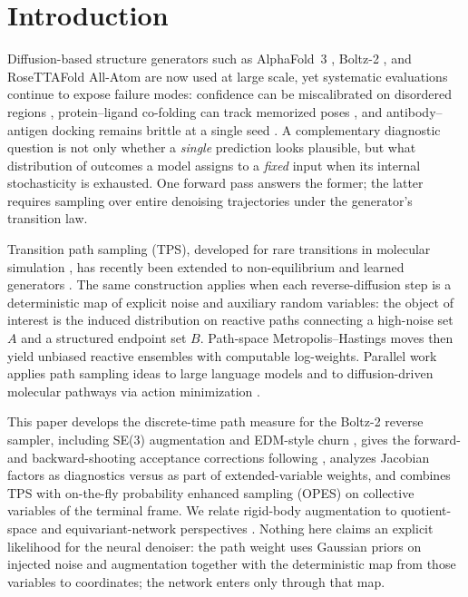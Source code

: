 \section{Introduction}
\label{sec:intro}

Diffusion-based structure generators such as AlphaFold~3 \citep{alphafold3},
Boltz-2 \citep{boltz2}, and RoseTTAFold All-Atom \citep{rfaa} are now used at
large scale, yet systematic evaluations continue to expose failure modes:
confidence can be miscalibrated on disordered regions \citep{gopalan2025},
protein--ligand co-folding can track memorized poses \citep{skrinjar2025}, and
antibody--antigen docking remains brittle at a single seed
\citep{hitawala2025}. A complementary diagnostic question is not only whether
a \emph{single} prediction looks plausible, but what distribution of outcomes a
model assigns to a \emph{fixed} input when its internal stochasticity is
exhausted. One forward pass answers the former; the latter requires sampling over
entire denoising trajectories under the generator's transition law.

Transition path sampling (TPS), developed for rare transitions in molecular
simulation \citep{dellago1998,bolhuis2002}, has recently been extended to
non-equilibrium and learned generators
\citep{buijsman2020,falkner2023,falkner2024}. The same construction applies when
each reverse-diffusion step is a deterministic map of explicit noise and
auxiliary random variables: the object of interest is the induced distribution
on reactive paths connecting a high-noise set $A$ and a structured endpoint
set $B$. Path-space Metropolis--Hastings moves then yield unbiased reactive
ensembles with computable log-weights. Parallel work applies path sampling ideas
to large language models \citep{dorman2026} and to diffusion-driven molecular
pathways via action minimization \citep{raja2025omtps}.

This paper develops the discrete-time path measure for the Boltz-2 reverse
sampler, including SE(3) augmentation and EDM-style churn \citep{karras2022},
gives the forward- and backward-shooting acceptance corrections following
\citet{buijsman2020,falkner2024}, analyzes Jacobian factors as diagnostics versus
as part of extended-variable weights, and combines TPS with on-the-fly
probability enhanced sampling (OPES) \citep{invernizzi2020,invernizzi2022} on
collective variables of the terminal frame. We relate rigid-body augmentation
to quotient-space and equivariant-network perspectives
\citep{xu2026quotient,yim2023se}. Nothing here claims an explicit likelihood for
the neural denoiser: the path weight uses Gaussian priors on injected noise and
augmentation together with the deterministic map from those variables to
coordinates; the network enters only through that map.

